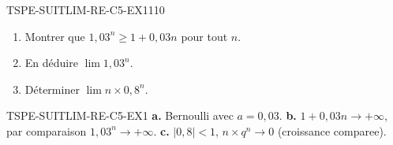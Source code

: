 

\begin{exercice}{TSPE-SUITLIM-RE-C5-EX1}{1}{10}
\begin{enumerate}
  \item Montrer que $1{,}03^n \geq 1 + 0{,}03n$ pour tout $n$.
  \item En déduire $\lim 1{,}03^n$.
  \item Déterminer $\lim n \times 0{,}8^n$.
\end{enumerate}
\end{exercice}


\begin{corrige}{TSPE-SUITLIM-RE-C5-EX1}
\textbf{a.} Bernoulli avec $a=0{,}03$. \textbf{b.} $1+0{,}03n \to +\infty$, par comparaison $1{,}03^n \to +\infty$. \textbf{c.} $|0{,}8|<1$, $n \times q^n \to 0$ (croissance comparee).
\end{corrige}
